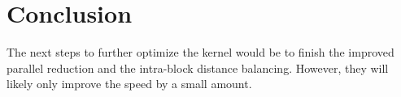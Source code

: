 \section{Conclusion}
\hspace{\parindent}The next steps to further optimize the kernel would be to finish the improved parallel reduction and the intra-block distance balancing. However, they will likely only improve the speed by a small amount. 

%  